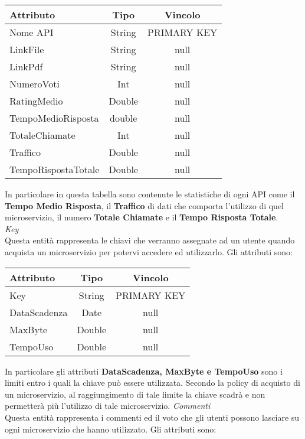 {{\begin{center}
			\renewcommand\arraystretch{1.2} \begin{tabular}{lcc}
				\textbf{Attributo}&\textbf{Tipo}&\textbf{Vincolo}\\ \hline
				Nome API&String&PRIMARY KEY\\
				LinkFile&String&null\\
				LinkPdf&String&null \\
				NumeroVoti&Int&null \\
				RatingMedio&Double&null \\
				TempoMedioRisposta&double&null \\
				TotaleChiamate&Int&null \\
				Traffico&Double&null \\
				TempoRispostaTotale&Double&null \\
			\end{tabular}
			\end{center}
			In particolare in questa tabella sono contenute le statistiche di ogni API come il \textbf{Tempo Medio Risposta}, il \textbf{Traffico} di dati che comporta l'utilizzo di quel microservizio, il numero \textbf{Totale Chiamate} e il \textbf{Tempo Risposta Totale}. \\
			\textit{Key}\\
			Questa entità rappresenta le chiavi che verranno assegnate ad un utente quando acquista un microservizio per potervi accedere ed utilizzarlo. Gli attributi sono: \\
			\begin{center}
			\renewcommand\arraystretch{1.2} \begin{tabular}{lcc}
				\textbf{Attributo}&\textbf{Tipo}&\textbf{Vincolo}\\ \hline
				Key&String&PRIMARY KEY\\
				DataScadenza&Date&null \\
				MaxByte&Double&null \\
				TempoUso&Double&null \\
			\end{tabular}
			\end{center}
			In particolare gli attributi \textbf{DataScadenza, MaxByte e TempoUso} sono i limiti entro i quali la chiave può essere utilizzata. Secondo la policy di acquisto di un microservizio, al raggiungimento di tale limite la chiave scadrà e non permetterà più l'utilizzo di tale microservizio.
			\textit{Commenti}\\
			Questa entità rappresenta i commenti ed il voto  che gli utenti possono lasciare su ogni microservizio che hanno utilizzato. Gli attributi sono:
}}
